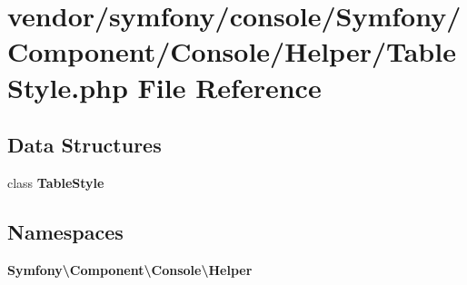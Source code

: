 \section{vendor/symfony/console/\+Symfony/\+Component/\+Console/\+Helper/\+Table\+Style.php File Reference}
\label{_table_style_8php}
\subsection*{Data Structures}
\begin{DoxyCompactItemize}
\item 
class {\bf Table\+Style}
\end{DoxyCompactItemize}
\subsection*{Namespaces}
\begin{DoxyCompactItemize}
\item 
 {\bf Symfony\textbackslash{}\+Component\textbackslash{}\+Console\textbackslash{}\+Helper}
\end{DoxyCompactItemize}
